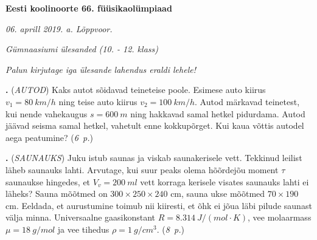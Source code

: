 \documentclass[12pt,a5paper]{article}
\newcommand{\numb}[1]{\vspace{5pt}\textbf{\large #1}}
\newcommand{\nimi}[1]{(\textsl{\small #1})}
\newcommand{\punktid}[1]{(\emph{#1~p.})}
\newcounter{ylesanne}
\newcommand{\yl}[1]{\addtocounter{ylesanne}{1}\numb{\theylesanne.} \nimi{#1} \newblock{}}
\begin{document}
\begin{center}
\textbf{\Large Eesti koolinoorte 66. füüsikaolümpiaad} \vspace{3pt}

\emph{06. aprill 2019. a. Lõppvoor.}

\emph{Gümnaasiumi ülesanded (10. - 12. klass)}

\emph{Palun kirjutage iga ülesande lahendus eraldi lehele!}

\end{center}

\yl{AUTOD}
Kaks autot sõidavad teineteise poole. Esimese auto kiirus $v_1=\SI{80}{km/h}$ ning teise auto kiirus $v_2 = \SI{100}{km/h}$. Autod märkavad teinetest, kui nende vahekaugus $s=\SI{600}{m}$ ning hakkavad samal hetkel pidurdama. Autod jäävad seisma samal hetkel, vahetult enne kokkupõrget. Kui kaua võttis autodel aega peatumine? \punktid{6}

\yl{SAUNAUKS}
Juku istub saunas ja viskab saunakerisele vett. Tekkinud leilist läheb saunauks lahti. Arvutage, kui suur peaks olema hõõrdejõu moment $\tau$ saunaukse hingedes, et $V_v=\SI{200}{ml}$ vett korraga kerisele visates saunauks lahti ei läheks? Sauna mõõtmed on $300 \times 250 \times 240$ cm, sauna ukse mõõtmed $70 \times 190$ cm. Eeldada, et aurustumine toimub nii kiiresti, et õhk ei jõua läbi pilude saunast välja minna. Universaalne gaasikonstant $R=\SI{8,314}{J/(mol \cdot K)}$, vee molaarmass $\mu=\SI{18}{g/mol}$ ja vee tihedus $\rho = \SI{1}{g/cm^3}$. \punktid{8}
\end{document}
